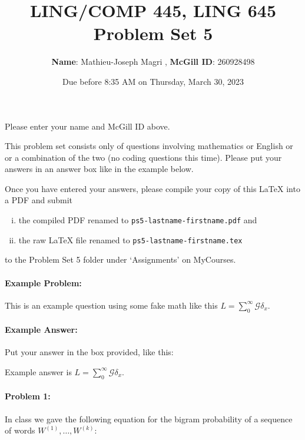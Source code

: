 \documentclass[10pt]{article}
\author{ 
  \textbf{Name}: Mathieu-Joseph Magri      %
, \textbf{McGill ID}: 260928498  %
}
\newenvironment{AnswerBox}{\begin{mdframed}[style=simple]}{\end{mdframed}}
\newcommand{\PSnum}{5}
\begin{document}
\title{LING/COMP 445, LING 645\\Problem Set \PSnum}
\date{Due before 8:35 AM on Thursday, March 30, 2023}
\maketitle
Please enter your name and McGill ID above.

This problem set consists only of questions involving mathematics or
English or or a combination of the two (no coding questions this time).
Please put your answers in an answer box like in the example below.

Once you have entered your answers, please compile your copy of this
\LaTeX{} into a PDF and submit 
\begin{enumerate}[(i),noitemsep]
\item
the compiled PDF renamed to
\texttt{ps\PSnum-lastname-firstname.pdf} and
\item
the raw \LaTeX{} file renamed to
\texttt{ps\PSnum-lastname-firstname.tex}
\end{enumerate}
to the Problem Set \PSnum{} folder under `Assignments' on MyCourses.


\hrulefill %

\paragraph{Example Problem:}
This is an example question using some fake math like this
$L=\sum_0^{\infty} \mathcal{G} \delta_x$.

\paragraph{Example Answer:} Put your answer in the box provided, like this:
\begin{AnswerBox}
Example answer is $L=\sum_0^{\infty} \mathcal{G} \delta_x$.
\end{AnswerBox}


\hrulefill%

\pagebreak%

\hrulefill %

\paragraph{Problem 1:}
 
In class we gave the following equation for the bigram probability of
a sequence of words $W^{(1)},\dots,W^{(k)}$:
\end{document}
